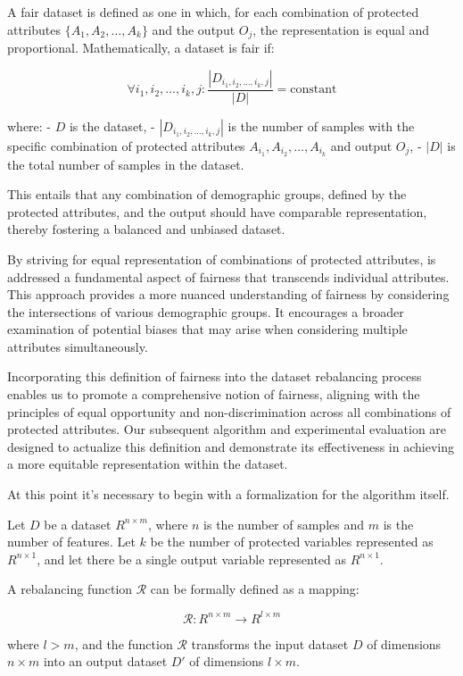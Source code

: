 A fair dataset is defined as one in which, for each combination of protected attributes $\{A_1, A_2, \ldots, A_k\}$ and the output $O_j$, the representation is equal and proportional. Mathematically, a dataset is fair if:

\[
\forall i_1, i_2, \ldots, i_k, j: \frac{|D_{i_1, i_2, \ldots, i_k, j}|}{|D|} = \text{constant}
\]

where:
- $D$ is the dataset,
- $|D_{i_1, i_2, \ldots, i_k, j}|$ is the number of samples with the specific combination of protected attributes $A_{i_1}, A_{i_2}, \ldots, A_{i_k}$ and output $O_j$,
- $|D|$ is the total number of samples in the dataset.

This entails that any combination of demographic groups, defined by the protected attributes, and the output should have comparable representation, thereby fostering a balanced and unbiased dataset.

By striving for equal representation of combinations of protected attributes, is addressed a fundamental aspect of fairness that transcends individual attributes. This approach provides a more nuanced understanding of fairness by considering the intersections of various demographic groups. It encourages a broader examination of potential biases that may arise when considering multiple attributes simultaneously.

Incorporating this definition of fairness into the dataset rebalancing process enables us to promote a comprehensive notion of fairness, aligning with the principles of equal opportunity and non-discrimination across all combinations of protected attributes. Our subsequent algorithm and experimental evaluation are designed to actualize this definition and demonstrate its effectiveness in achieving a more equitable representation within the dataset.

At this point it's necessary to begin with a formalization for the algorithm itself.


Let \( D \) be a dataset \( R^{n \times m} \), where \( n \) is the number of samples and \( m \) is the number of features. Let \( k \) be the number of protected variables represented as \( R^{n \times 1} \), and let there be a single output variable represented as \( R^{n \times 1} \).

A rebalancing function \( \mathcal{R} \) can be formally defined as a mapping:

\[
\mathcal{R}: R^{n \times m} \rightarrow R^{l \times m}
\]

where \( l > m \), and the function \( \mathcal{R} \) transforms the input dataset \( D \) of dimensions \( n \times m \) into an output dataset \( D' \) of dimensions \( l \times m \).



